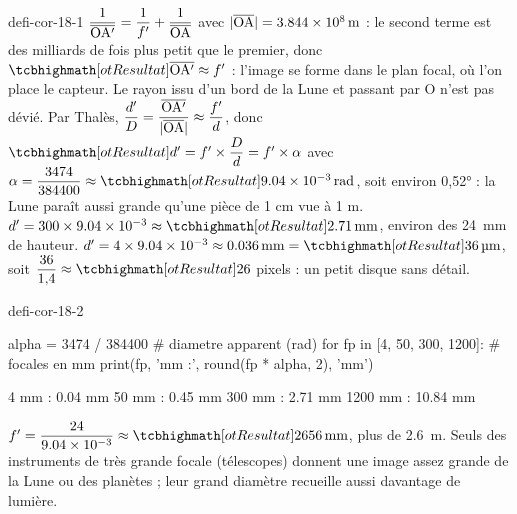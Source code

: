 \begin{blocEdition}{defi-cor-18-1}
$\dfrac{1}{\overline{\mathrm{OA'}}}=\dfrac{1}{f'}+\dfrac{1}{\overline{\mathrm{OA}}}$ avec $|\overline{\mathrm{OA}}|=\qty{3,844e8}{m}$ : le second terme est des milliards de fois plus petit que le premier, donc
$\res{\alg{OA'}\approx f'}$ : l'image se forme dans le plan focal, où l'on place le capteur.
Le rayon issu d'un bord de la Lune et passant par O n'est pas dévié. Par Thalès, $\dfrac{d'}{D}=\dfrac{\overline{\mathrm{OA'}}}{|\overline{\mathrm{OA}}|}\approx\dfrac{f'}{d}$, donc $\res{d'=f'\times\dfrac{D}{d}=f'\times\alpha}$
avec $\alpha=\dfrac{3474}{384400}\approx\res{\qty{9,04e-3}{rad}}$, soit environ \ang{0,52} : la Lune paraît aussi grande qu'une pièce de 1 cm vue à 1 m.
$d'=300\times\num{9,04e-3}\approx\res{\qty{2,71}{mm}}$, environ  des \qty{24}{mm} de hauteur.
$d'=4\times\num{9,04e-3}\approx\qty{0,036}{mm}=\res{\qty{36}{\micro m}}$, soit $\dfrac{36}{1{,}4}\approx\res{26}$ pixels : un petit disque sans détail.
\label{figedition-defi-cor-18-1-1}
\end{blocEdition}

\begin{blocEdition}{defi-cor-18-2}
\begin{python}
alpha = 3474 / 384400              # diametre apparent (rad)
for fp in [4, 50, 300, 1200]:      # focales en mm
    print(fp, 'mm :', round(fp * alpha, 2), 'mm')
\end{python}
\begin{console}
4 mm : 0.04 mm
50 mm : 0.45 mm
300 mm : 2.71 mm
1200 mm : 10.84 mm
\end{console}
$f'=\dfrac{24}{\num{9,04e-3}}\approx\res{\qty{2656}{mm}}$, plus de \qty{2,6}{m}. Seuls des instruments de très grande focale (télescopes) donnent une image assez
grande de la Lune ou des planètes ; leur grand diamètre recueille aussi davantage de lumière.
\end{blocEdition}

